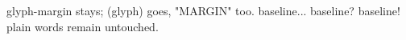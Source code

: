 glyph-margin stays; (glyph) goes, "MARGIN" too.
baseline... baseline? baseline!
plain words remain untouched.
